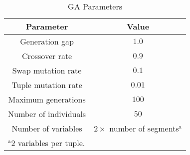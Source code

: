 \documentclass[conference]{IEEEtran}
\begin{document}
\begin{table}[htbp]
\caption{GA Parameters}
\begin{center}
\begin{tabular}{|c|c|}
\hline
\textbf{Parameter}&\textbf{Value} \\
\hline
Generation gap & $1.0$ \\
\hline
Crossover rate & $0.9$  \\
\hline
Swap mutation rate & $0.1$  \\
\hline
Tuple mutation rate & $0.01$  \\
\hline
Maximum generations & $100$  \\
\hline
Number of individuals & $50$  \\
\hline
Number of variables & $2\times$ number of segments$^{\mathrm{a}}$  \\
\hline
\multicolumn{2}{l}{$^{\mathrm{a}}$2 variables per tuple.}
\end{tabular}
\label{gaParameters}
\end{center}
\end{table}
\end{document}
